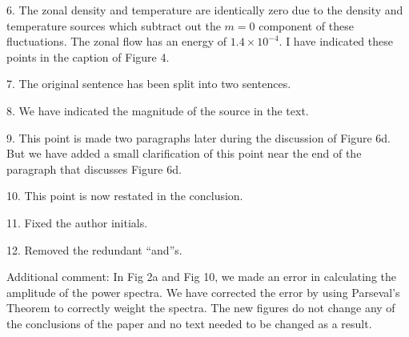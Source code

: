 \documentclass[12pt]{article}
\begin{document}
6. The zonal density and temperature are identically zero due to the density and temperature sources which subtract out the $m=0$ component of these fluctuations. The zonal flow has an energy
of $1.4 \times 10^{-4}$. I have indicated these points in the caption of Figure 4.

7. The original sentence has been split into two sentences.

8. We have indicated the magnitude of the source in the text.

9. This point is made two paragraphs later during the discussion of Figure 6d. But we have added a small clarification of this point near the end of the paragraph that discusses Figure 6d.

10. This point is now restated in the conclusion.

11. Fixed the author initials.

12. Removed the redundant ``and''s.


Additional comment: In Fig 2a and Fig 10, we made an error in calculating the amplitude of the power spectra. We have corrected the error by using Parseval's Theorem to correctly
weight the spectra. The new figures do not change any of the conclusions of the paper and no text needed to be changed as a result.
\end{document}
